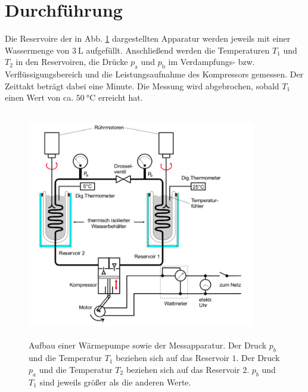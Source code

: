 \section{Durchführung}
\label{sec:Durchführung}

Die Reservoire der in Abb. \ref{fig:aufbau2} dargestellten Apparatur werden jeweils mit einer Wassermenge von 
$\SI{3}{\liter}$ aufgefüllt. Anschließend werden die Temperaturen $T_1$ und $T_\text{2}$ in den 
Reservoiren, die Drücke $p_\text{a}$ und $p_\text{b}$ im Verdampfungs- bzw. Verflüssigungsbereich und 
die Leistungsaufnahme des Kompressors gemessen. Der Zeittakt beträgt dabei eine Minute. 
Die Messung wird abgebrochen, sobald $T_1$ einen Wert von ca. $\SI{50}{\degreeCelsius}$ 
erreicht hat. 
\begin{figure}
    \centering
    \includegraphics[width=10cm, height=10cm]{build/2.png}
    \caption{Aufbau einer Wärmepumpe sowie der Messapparatur.
    Der Druck $p_b$ und die Temperatur
    $T_1$ beziehen sich auf das Reservoir $\num{1}$. Der Druck $p_a$ und die Temperatur
    $T_2$ beziehen sich auf das Reservoir $\num{2}$. $p_b$ und $T_1$ sind jeweils
    größer als die anderen Werte.}
    \label{fig:aufbau2}
\end{figure}